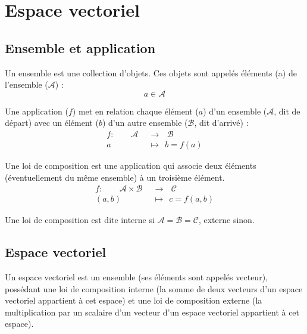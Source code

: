 
\chapter{Espace vectoriel}

\section{Ensemble et application}
Un ensemble est une collection d'objets. Ces objets sont appelés éléments (a) de l'ensemble ($\mathcal{A}$) :
\[
 a \in \mathcal{A}
\]


Une application ($f$) met en relation chaque élément ($a$) d'un ensemble ($\mathcal{A}$, dit de départ) avec un élément ($b$) d'un autre ensemble ($\mathcal{B}$, dit d'arrivé) :
\begin{align*}
f :\ \ \ \ \ \ \ \ \ \mathcal{A} \ \  & \rightarrow \ \ \ \mathcal{B} \\
a \ \ & \mapsto \ \ b = f(a)
\end{align*}

Une loi de composition est une application qui associe deux éléments (éventuellement du même ensemble) à un troisième élément. 
\begin{align*}
f :\ \ \ \ \ \ \ \ \ \mathcal{A} \times \mathcal{B} \ \  & \rightarrow \ \ \ \mathcal{C} \\
(a,b) \ \ & \mapsto \ \ c = f(a,b)
\end{align*}

Une loi de composition est dite interne si $\mathcal{A} = \mathcal{B} = \mathcal{C}$, externe sinon.



\section{Espace vectoriel}
%
Un espace vectoriel est un ensemble (ses éléments sont appelés vecteur), possédant une loi de composition interne (la somme de deux vecteurs d'un espace vectoriel appartient à cet espace) et une loi de composition externe (la multiplication par un scalaire d'un vecteur d'un espace vectoriel appartient à cet espace).


